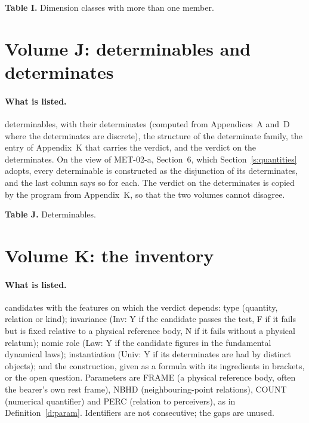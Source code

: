\begin{center}\textbf{Table I.} Dimension classes with more than one member.\end{center}


\section{Volume J: determinables and determinates}\label{app:j}

\paragraph{What is listed.} \vvNJ{} determinables, with their determinates (computed from Appendices~A and~D where the determinates are discrete), the structure of the determinate family, the entry of Appendix~K that carries the verdict, and the verdict on the determinates. On the view of MET-02-a, Section~6, which Section~\ref{s:quantities} adopts, every determinable is constructed as the disjunction of its determinates, and the last column says so for each. The verdict on the determinates is copied by the program from Appendix~K, so that the two volumes cannot disagree.

\begin{center}\textbf{Table J.} Determinables.\end{center}


\section{Volume K: the inventory}\label{app:k}

\paragraph{What is listed.} \vvNK{} candidates with the features on which the verdict depends: type (quantity, relation or kind); invariance (Inv: Y if the candidate passes the test, F if it fails but is fixed relative to a physical reference body, N if it fails without a physical relatum); nomic role (Law: Y if the candidate figures in the fundamental dynamical laws); instantiation (Univ: Y if its determinates are had by distinct objects); and the construction, given as a formula with its ingredients in brackets, or the open question. Parameters are FRAME (a physical reference body, often the bearer's own rest frame), NBHD (neighbouring-point relations), COUNT (numerical quantifier) and PERC (relation to perceivers), as in Definition~\ref{d:param}. Identifiers are not consecutive; the gaps are unused.

